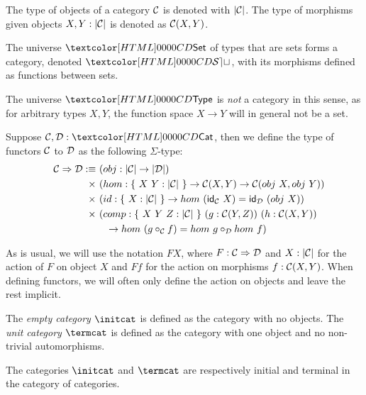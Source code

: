 The type of objects of a category $\mathcal{C}$ is denoted with $| \mathcal{C} |$. The
type of morphisms given objects $X, Y : | \mathcal{C} |$ is denoted as
$\mathcal{C}(X,Y)$.

\begin{example}
  The universe $\Set$ of types that are sets forms a category, denoted
  $\SET$, with its morphisms defined as functions between sets.
\end{example}

\begin{remark}
  The universe $\Type$ is \emph{not} a category in this sense, as for
  arbitrary types $X, Y$, the function space $X \to Y$ will in general
  not be a set.
\end{remark}

\begin{definition}[Functor]
  Suppose $\Cc, \Dd : \Cat$, then we define the type of functors $\mathcal{C}$
  to $\mathcal{D}$ as the following $\Sigma$-type:
  \begin{align*}
    &&\Func{\Cc}{\Dd} \ddefeq &\ (obj : | \Cc | \to | \Dd |) \\
                    &&\times  &\ (hom : \{\ X\ Y : | \Cc |\ \} \to \Cc(X,Y) \to \Cc(obj\ X, obj\ Y)) \\
                    &&\times  &\ (id : \{\ X : | \Cc |\ \} \to hom\ (\id_{\Cc}\ X) = \id_{\Dd}\ (obj\ X)) \\
                    &&\times  &\ (comp : \{\ X\ Y\ Z : | \Cc |\ \}\ (g : \Cc(Y,Z))\ (h : \Cc(X,Y)) \\
                    &&&\ \ \ \to hom\ (g \circ_{\Cc} f) = hom\ g \circ_{\Dd} hom\ f)
  \end{align*}
\end{definition}

As is usual, we will use the notation $F X$, where
$F : \mathcal{C} \Rightarrow \mathcal{D}$ and $X : | \mathcal{C} |$ for the action of $F$ on
object $X$ and $F f$ for the action on morphisms $f : \mathcal{C}(X,Y)$. When
defining functors, we will often only define the action on objects and
leave the rest implicit.

\begin{definition}
  The \emph{empty category} $\initcat$ is defined as the category with
  no objects. The \emph{unit category} $\termcat$ is defined as the
  category with one object and no non-trivial automorphisms.
\end{definition}

The categories $\initcat$ and $\termcat$ are respectively initial and
terminal in the category of categories.


